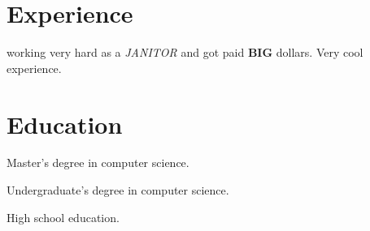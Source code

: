 \documentclass[paper=a4, fontsize=11pt]{resume}
\begin{document}


\section{Experience}

working very hard as a \emph{JANITOR} and got paid \textbf{BIG}
dollars. Very cool experience.



\section{Education}

Master's degree in computer science.

Undergraduate's degree in computer science.

High school education.
\end{document}
